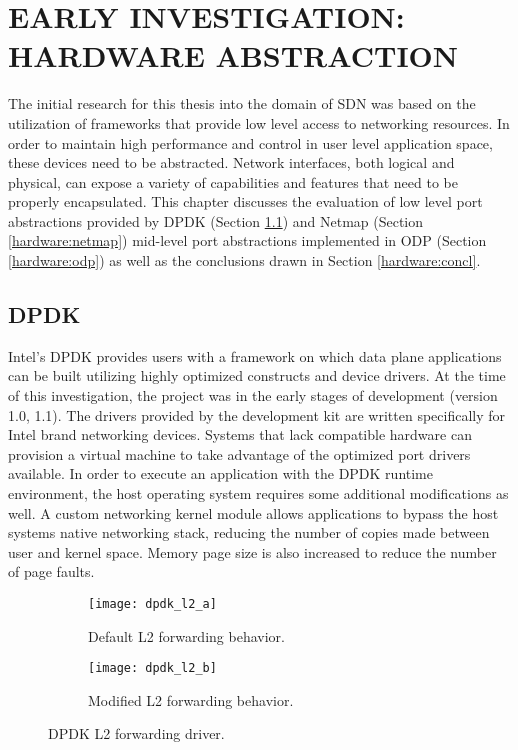 \chapter{EARLY INVESTIGATION: HARDWARE ABSTRACTION}
\label{hardware}
The initial research for this thesis into the domain of SDN was based on
the utilization of frameworks that provide low level access to networking
resources. In order to maintain high performance and control in user level
application space, these devices need to be abstracted. Network interfaces,
both logical and physical, can expose a variety of capabilities and features
that need to be properly encapsulated. This chapter discusses the evaluation of
low level port abstractions provided by DPDK (Section \ref{hardware:dpdk}) and
Netmap (Section \ref{hardware:netmap}) mid-level port abstractions implemented
in ODP (Section \ref{hardware:odp}) as well as the conclusions drawn in Section
\ref{hardware:concl}.

\section{DPDK}
\label{hardware:dpdk}
Intel's DPDK provides users with a framework on which data plane applications
can be built utilizing highly optimized constructs and device drivers. At the
time of this investigation, the project was in the early stages of development
(version 1.0, 1.1). The drivers provided by the development kit are written
specifically for Intel brand networking devices. Systems that lack compatible
hardware can provision a virtual machine to take advantage of the optimized
port drivers available. In order to execute an application with the DPDK runtime
environment, the host operating system requires some additional modifications
as well. A custom networking kernel module allows applications to bypass the
host systems native networking stack, reducing the number of copies made
between user and kernel space. Memory page size is also increased to reduce
the number of page faults.

\begin{figure}[h!]
  \centering
  \begin{subfigure}[b]{0.48\textwidth}
    \centering
    \texttt{[image: dpdk\_l2\_a]}
    \caption{Default L2 forwarding behavior.}
  \end{subfigure}
  \hfill
  \begin{subfigure}[b]{0.48\textwidth}
    \centering
    \texttt{[image: dpdk\_l2\_b]}
    \caption{Modified L2 forwarding behavior.}
  \end{subfigure}
  \caption{DPDK L2 forwarding driver.}
  \label{dpdk_l2}
\end{figure}

